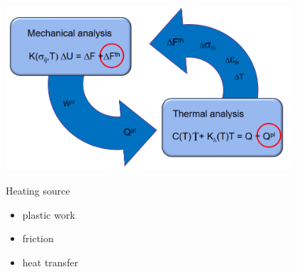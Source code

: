\documentclass[landscape,a0paper,fontscale=0.285]{baposter} %
\newcommand{\compresslist}{ %
\setlength{\itemsep}{1pt}
\setlength{\parskip}{0pt}
\setlength{\parsep}{0pt}
}
\begin{document}
\begin{poster}
{\begin{center}
\includegraphics[width=0.8\textwidth]{figures/ETHz_AFEA_FEM_Thermo_coupled.png}
\end{center}

Heating source
\begin{itemize}\compresslist
    \item plastic work
    \item friction
    \item heat transfer
\end{itemize}

}



\end{poster}
\end{document}
